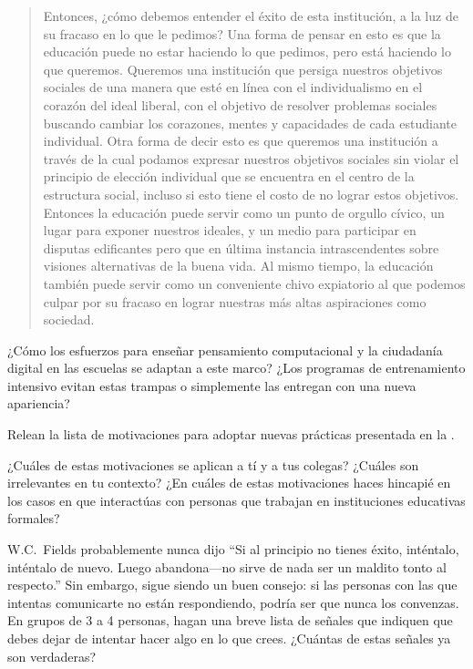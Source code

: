 \begin{quote}

Entonces, ¿cómo debemos entender el éxito de esta institución,
a la luz de su fracaso en lo que le pedimos?
Una forma de pensar en esto es que
la educación puede no estar haciendo lo que pedimos,
pero está haciendo lo que queremos.
Queremos una institución que persiga nuestros objetivos sociales
de una manera que esté en línea con el individualismo en el corazón del ideal liberal,
con el objetivo de resolver problemas sociales
buscando cambiar los corazones, mentes y capacidades de cada estudiante individual.
Otra forma de decir esto es que
queremos una institución a través de la cual podamos expresar nuestros objetivos sociales
sin violar el principio de elección individual
que se encuentra en el centro de la estructura social,
incluso si esto tiene el costo de no lograr estos objetivos.
Entonces la educación puede servir como un punto de orgullo cívico,
un lugar para exponer nuestros ideales,
y un medio para participar en disputas edificantes pero  
que en última instancia intrascendentes
sobre visiones alternativas de la buena vida.
Al mismo tiempo,
la educación también puede servir como un conveniente chivo expiatorio
al que podemos culpar por su fracaso en lograr nuestras más altas aspiraciones como sociedad.

\end{quote}

¿Cómo los esfuerzos para enseñar pensamiento computacional y la ciudadanía digital en las escuelas se adaptan a este marco?
¿Los programas de entrenamiento intensivo evitan estas trampas o simplemente las entregan con una nueva apariencia?


Relean la lista de motivaciones para adoptar nuevas prácticas
presentada en la .

¿Cuáles de estas motivaciones se aplican a tí y a tus colegas?
¿Cuáles son irrelevantes en tu contexto?
¿En cuáles de estas motivaciones haces hincapié
en los casos en que interactúas con personas que trabajan en instituciones educativas formales?



W.C.~Fields probablemente nunca dijo
``Si al principio no tienes éxito, inténtalo, inténtalo de nuevo.
Luego abandona---no sirve de nada ser un maldito tonto al respecto.''
Sin embargo, sigue siendo un buen consejo:
si las personas con las que intentas comunicarte no están respondiendo,
podría ser que nunca los convenzas.
En grupos de 3 a 4 personas,
hagan una breve lista de señales que indiquen que debes dejar de intentar hacer algo en lo que crees.
¿Cuántas de estas señales ya son verdaderas?



